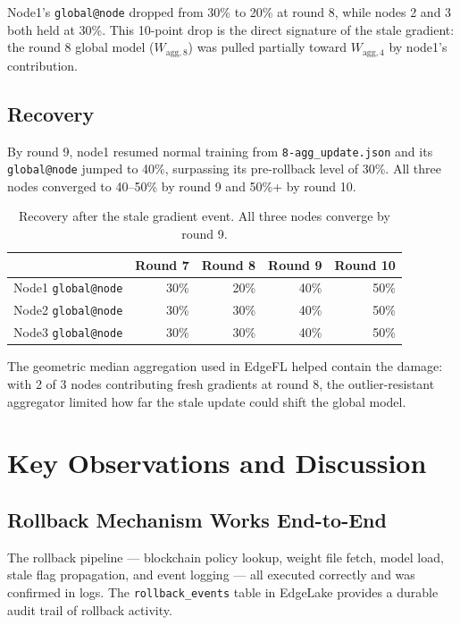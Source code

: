 \documentclass[11pt]{article}
\begin{document}
Node1's \texttt{global@node} dropped from 30\% to 20\% at round 8, while nodes 2 and 3 both held at 30\%. This 10-point drop is the direct signature of the stale gradient: the round 8 global model ($W_{\text{agg},8}$) was pulled partially toward $W_{\text{agg},4}$ by node1's contribution.

\subsection{Recovery}

By round 9, node1 resumed normal training from \texttt{8-agg\_update.json} and its \texttt{global@node} jumped to 40\%, surpassing its pre-rollback level of 30\%. All three nodes converged to 40--50\% by round 9 and 50\%+ by round 10.

\begin{table}[H]
\centering
\begin{tabular}{lrrrr}
\toprule
 & \textbf{Round 7} & \textbf{Round 8} & \textbf{Round 9} & \textbf{Round 10} \\
\midrule
Node1 \texttt{global@node} & 30\% & 20\% & 40\% & 50\% \\
Node2 \texttt{global@node} & 30\% & 30\% & 40\% & 50\% \\
Node3 \texttt{global@node} & 30\% & 30\% & 40\% & 50\% \\
\bottomrule
\end{tabular}
\caption{Recovery after the stale gradient event. All three nodes converge by round 9.}
\end{table}

The geometric median aggregation used in EdgeFL helped contain the damage: with 2 of 3 nodes contributing fresh gradients at round 8, the outlier-resistant aggregator limited how far the stale update could shift the global model.

\section{Key Observations and Discussion}

\subsection{Rollback Mechanism Works End-to-End}

The rollback pipeline — blockchain policy lookup, weight file fetch, model load, stale flag propagation, and event logging — all executed correctly and was confirmed in logs. The \texttt{rollback\_events} table in EdgeLake provides a durable audit trail of rollback activity.
\end{document}
